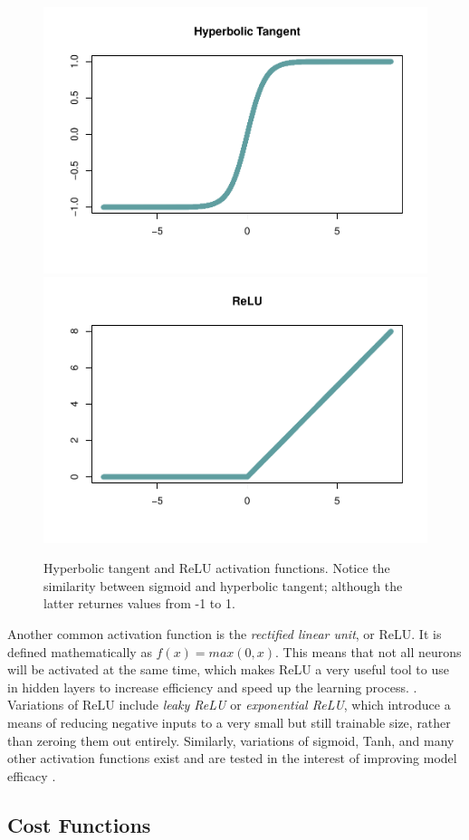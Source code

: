 \begin{figure}[H]
    \vspace{-10pt}
    \includegraphics[width=0.5\linewidth]{Figures/other-activation-functions-1.pdf}
    \includegraphics[width=0.5\linewidth]{Figures/other-activation-functions-2.pdf}
    \vspace{-40pt}
    \caption{\footnotesize Hyperbolic tangent and ReLU activation functions.  Notice the similarity between sigmoid and hyperbolic tangent; although the latter returnes values from -1 to 1.}
\end{figure}

Another common activation function is the \textit{rectified linear unit}, or ReLU.  It is defined mathematically as $f(x) = max(0,x)$.  This means that not all neurons will be activated at the same time, which makes ReLU a very useful tool to use in hidden layers to increase efficiency and speed up the learning process. \cite{Goodfellow-et-al-2016} \cite{sharma2017activation}. 
 Variations of ReLU include \textit{leaky ReLU} or \textit{exponential ReLU}, which introduce a means of reducing negative inputs to a very small but still trainable size, rather than zeroing them out entirely.  Similarly, variations of sigmoid, Tanh, and many other activation functions exist and are tested in the interest of improving model efficacy \cite{banerjee2019empirical}.



\hypertarget{cost-functions}{%
\subsection{Cost Functions}\label{cost-functions}}

